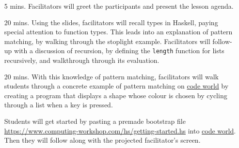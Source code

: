 \documentclass[11pt]{article}
\newcommand{\cwurl}{https://www.computing-workshop.com/}
\newcommand{\bootstrapurl}{\url{\cwurl hs/getting-started.hs}}
\newcommand{\codeworld}{\href{http://code.world/}{code world}}
\begin{document}
\begin{itemize}
\item[5 mins.]
  Facilitators will greet the participants and present the lesson agenda.
\item[20 mins.]
  Using the slides, facilitators will recall types in Haskell, paying special
  attention to function types. This leads into an explanation of pattern
  matching, by walking through the stoplight example.
  Facilitators will follow-up with a discussion of recursion, by defining the
  \texttt{length} function for lists recursively, and walkthrough through its
  evaluation.
\item[20 mins.]
  With this knowledge of pattern matching, facilitators will walk students
  through a concrete example of pattern matching on \codeworld{} by creating a
  program that displays a shape whose colour is chosen by cycling through a list
  when a key is pressed.

  Students will get started by pasting a premade bootstrap file \bootstrapurl{}
  into \codeworld. Then they will follow along with the projected facilitator's
  screen.
\end{itemize}
\end{document}
